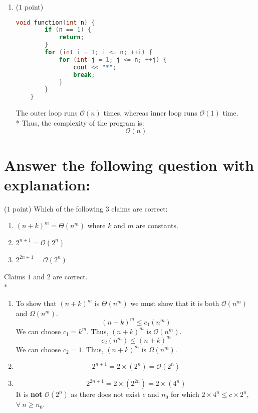 \documentclass[14pt]{article}
\begin{document}
\begin{enumerate}[label=\alph*)]
    \item ($1$ point)
    \begin{lstlisting}[language=C++, title={Part (c)}]
    void function(int n) {
        if (n == 1) {
            return;
        }
        for (int i = 1; i <= n; ++i) {
            for (int j = 1; j <= n; ++j) {
                cout << "*";
                break;
            }
        }
    }
    \end{lstlisting}
    \begin{myframe}[width=500pt,height=120pt,top=10pt,bottom=10pt,left=10pt,right=10pt,arc=10pt,auto outer arc]
    The outer loop runs $\mathcal{O}(n)$ times, whereas inner loop runs $\mathcal{O}(1)$ time. \\*
    Thus, the complexity of the program is:
    \[ \boxed{\mathcal{O}(n)} \]
    \end{myframe}
\end{enumerate}

\section{Answer the following question with explanation:}
($1$ point) Which of the following 3 claims are correct:

\begin{enumerate}
    \item $(n + k)^{m} = \Theta(n^m)$ where $k$ and $m$ are constants.
    \item $2^{n + 1} = \mathcal{O}(2^{n})$
    \item $2^{2n + 1} = \mathcal{O}(2^{n})$
\end{enumerate}

\begin{myframe}[width=500pt,height=250pt,top=10pt,bottom=10pt,left=10pt,right=10pt,arc=10pt,auto outer arc]
Claims $1$ and $2$ are correct. \\*
\begin{enumerate}
    \item To show that $(n + k)^{m}$ is $\Theta(n^{m})$ we must show that it is both $\mathcal{O}(n^m)$ and $\Omega(n^m)$.
    \[(n + k)^{m} \leq c_{1} (n^{m}) \] 
    We can choose $c_{1} = k^{m}$. Thus, $(n + k)^{m}$ is $\mathcal{O}(n^{m})$.
    \[c_{2} (n^{m}) \leq (n + k)^{m} \] 
    We can choose $c_{2} = 1$. Thus, $(n + k)^{m}$ is $\Omega(n^{m})$.
    \item 
    \[ 2^{n+1} = 2 \times (2^{n}) = \mathcal{O}(2^{n})\]
    \item 
    \[ 2^{2n+1} = 2 \times (2^{2n}) = 2 \times (4^{n})\]
    It is \textbf{not} $\mathcal{O}(2^{n})$ as there does not exist $c$ and $n_{0}$ for which $2\times4^{n} \leq c\times2^{n}$, $\forall\ n \geq n_{0}$.
    
\end{enumerate}

\end{myframe}
\end{document}
